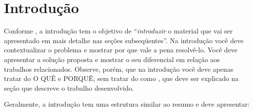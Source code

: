 \section{Introdução}

Conforme , a introdução tem o objetivo de ``\emph{introduzir} o material que vai ser apresentado em mais detalhe nas seções subseqüentes''. Na introdução você deve contextualizar o problema e mostrar por que vale a pena resolvê-lo. Você deve apresentar a solução proposta e mostrar o seu diferencial em relação aos trabalhos relacionados. Observe, porém, que na introdução você deve apenas tratar do O QUÊ e PORQUÊ, sem tratar do como \cite{Hexsel11}, que deve ser explicado na seção que descreve o trabalho desenvolvido.

Geralmente, a introdução tem uma estrutura similar ao resumo e deve apresentar:

